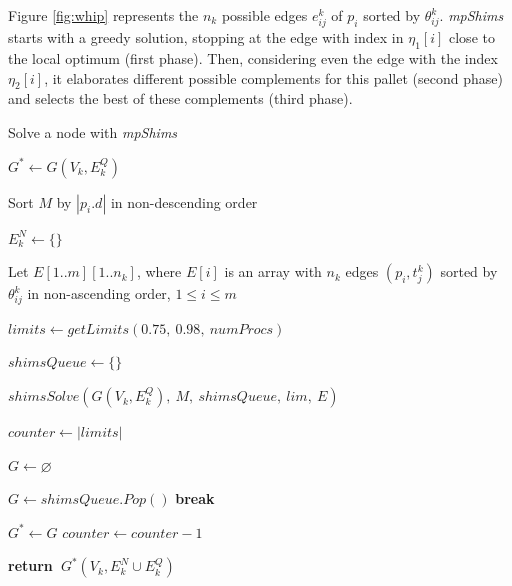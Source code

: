 \documentclass[preprint,authoryear]{elsarticle}
\newcommand{\Break}{\State \bf {break}}
\renewcommand{\Return}{\State \bf {return}~}
\begin{document}
Figure \ref{fig:whip} represents the $n_k$\/ possible edges $e_{ij}^k$\/ of $p_i$\/ sorted by $\theta_{ij}^k$. \emph{mpShims}\/ starts with a greedy solution, stopping at the edge with index in $\eta_1[i]$ close to the local optimum (first phase). Then, considering even the edge with the index $\eta_2[i]$, it elaborates different possible complements for this pallet (second phase) and selects the best of these complements (third phase).


\begin{algorithm}[H]
	\caption{Solve a node with {\it mpShims}}  \label{alg:mpshims}
	\begin{algorithmic}[1]
		
		
		\State $G^* \gets G(V_k, E^Q_k)$ \label{best_so_far}
		
		\State Sort $M$ by $|p_i.d|$ in non-descending order \label{mpshims:pallets}
		
		\State $E^N_k \gets \{\}$ \label{mpshims:items}
		
		\State Let $E[1..m][1..n_k]$, where $E[i]$ is an array with $n_k$ edges $(p_i,t^k_j)$ sorted by $\theta_{ij}^k$ in non-ascending order, $1 \leq i \leq m$ \label{mpshims:edges}
		
		\State $limits \gets getLimits(0.75,\ 0.98,\ numProcs)$ \label{mpshims:limits}
		
		\State $shimsQueue \gets \{\}$ \label{mpshims:queue}
	
			\State $shimsSolve(G(V_k, E^Q_k),\ M,\ shimsQueue,\ lim,\ E)$ \label{mpshims:send}
		\EndFor
		
		\State $counter \gets |limits|$
		
			
			\State $G \gets \varnothing$

			 
			
			\State $G \gets shimsQueue.Pop()$
					\Break
				\EndIf
			\EndWhile
			
			\If{$f_s(G) > f_s(G^*)$}
				\State $G^* \gets G$ 
			\EndIf
			\State $counter \gets counter - 1$			
		
		\EndWhile		
		
		\Return $G^*(V_k, E^N_k \cup E^Q_k)$ \label{mpshims:return}
		
		\EndProcedure
	\end{algorithmic}
\end{algorithm}
\end{document}
